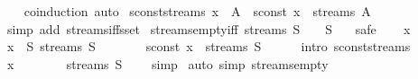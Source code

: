 \begin{isabellebody}
%
\isadelimproof
\ \ %
\endisadelimproof
%
\isatagproof
{}\isamarkupfalse%
\ coinduction\ auto%
\endisatagproof
{\isafoldproof}%
%
\isadelimproof
\isanewline
%
\endisadelimproof
\isanewline
{}\isamarkupfalse%
\ sconst{\isacharunderscore}streams{\isacharcolon}\ {\isachardoublequoteopen}x\ {\isasymin}\ A\ {\isasymLongrightarrow}\ sconst\ x\ {\isasymin}\ streams\ A{\isachardoublequoteclose}\isanewline
%
\isadelimproof
\ \ %
\endisadelimproof
%
\isatagproof
{}\isamarkupfalse%
\ {\isacharparenleft}simp\ add{\isacharcolon}\ streams{\isacharunderscore}iff{\isacharunderscore}sset{\isacharparenright}%
\endisatagproof
{\isafoldproof}%
%
\isadelimproof
\isanewline
%
\endisadelimproof
\isanewline
{}\isamarkupfalse%
\ streams{\isacharunderscore}empty{\isacharunderscore}iff{\isacharcolon}\ {\isachardoublequoteopen}streams\ S\ {\isacharequal}\ {\isacharbraceleft}{\isacharbraceright}\ {\isasymlongleftrightarrow}\ S\ {\isacharequal}\ {\isacharbraceleft}{\isacharbraceright}{\isachardoublequoteclose}\isanewline
%
\isadelimproof
%
\endisadelimproof
%
\isatagproof
{}\isamarkupfalse%
\ safe\isanewline
\ \ \isamarkupfalse%
\ x\ \isamarkupfalse%
\ {\isachardoublequoteopen}x\ {\isasymin}\ S{\isachardoublequoteclose}\ {\isachardoublequoteopen}streams\ S\ {\isacharequal}\ {\isacharbraceleft}{\isacharbraceright}{\isachardoublequoteclose}\isanewline
\ \ \isamarkupfalse%
\ \isamarkupfalse%
\ {\isachardoublequoteopen}sconst\ x\ {\isasymin}\ streams\ S{\isachardoublequoteclose}\isanewline
\ \ \ \ \isamarkupfalse%
\ {\isacharparenleft}intro\ sconst{\isacharunderscore}streams{\isacharparenright}\isanewline
\ \ \isamarkupfalse%
\ \isamarkupfalse%
\ {\isachardoublequoteopen}x\ {\isasymin}\ {\isacharbraceleft}{\isacharbraceright}{\isachardoublequoteclose}\isanewline
\ \ \ \ \isamarkupfalse%
\ {\isacartoucheopen}streams\ S\ {\isacharequal}\ {\isacharbraceleft}{\isacharbraceright}{\isacartoucheclose}\ \isamarkupfalse%
\ simp\isanewline
{}\isamarkupfalse%
\ {\isacharparenleft}auto\ simp{\isacharcolon}\ streams{\isacharunderscore}empty{\isacharparenright}%
\endisatagproof
{\isafoldproof}%
%
\isadelimproof
%
\endisadelimproof
%
\isadelimdocument
%
\endisadelimdocument
%
\isatagdocument
%
\isamarkuptrue%
%
\endisatagdocument
{\isafolddocument}%
%
\isadelimdocument
%
\endisadelimdocument
{}\isamarkupfalse%

\end{isabellebody}
